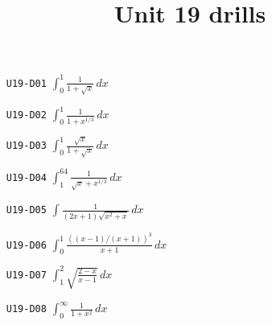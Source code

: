 \title{Unit 19 drills}\maketitle\begin{enumerate}
  \item[\texttt{U19-D01}] $\displaystyle \int_{0}^{1}\frac{1}{1+\sqrt{x}}\,dx$
  \item[\texttt{U19-D02}] $\displaystyle \int_{0}^{1}\frac{1}{1+x^{1/3}}\,dx$
  \item[\texttt{U19-D03}] $\displaystyle \int_{0}^{1}\frac{\sqrt{x}}{1+\sqrt{x}}\,dx$
  \item[\texttt{U19-D04}] $\displaystyle \int_{1}^{64}\frac{1}{\sqrt{x}+x^{1/3}}\,dx$
  \item[\texttt{U19-D05}] $\displaystyle \int\frac{1}{(2x+1)\sqrt{x^{2}+x}}\,dx$
  \item[\texttt{U19-D06}] $\displaystyle \int_{0}^{1}\frac{((x-1)/(x+1))^{3}}{x+1}\,dx$
  \item[\texttt{U19-D07}] $\displaystyle \int_{1}^{2}\sqrt{\frac{2-x}{x-1}}\,dx$
  \item[\texttt{U19-D08}] $\displaystyle \int_{0}^{\infty}\frac{1}{1+x^{2}}\,dx$
\end{enumerate}
